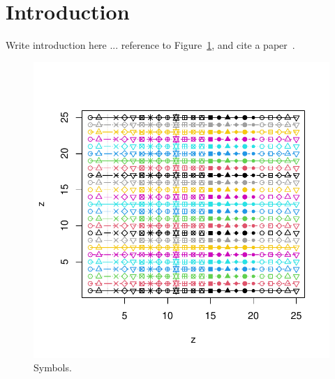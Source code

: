 \section{Introduction}
\label{sec:intro}

Write introduction here ... reference to Figure~\ref{fig:symbols}, and cite a paper~\cite{HCHFC21}. \lipsum

\begin{figure}
\includegraphics[width=.99\columnwidth]{images/symbols.pdf}
\caption{Symbols.}
\label{fig:symbols}
\end{figure}

